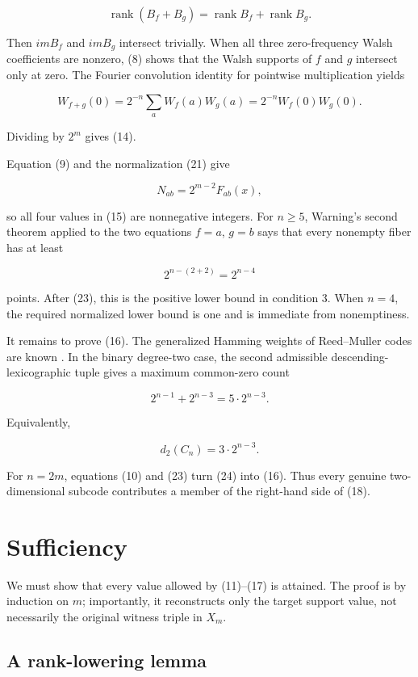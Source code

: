 \documentclass[11pt]{article}
\theoremstyle{remark}
\begin{document}
\[
\operatorname{rank}(B_f+B_g)
=\operatorname{rank}B_f+\operatorname{rank}B_g.
\]

Then $im B_f$ and $im B_g$ intersect trivially. When all three zero-frequency Walsh coefficients are nonzero, (8) shows that the Walsh supports of $f$ and $g$ intersect only at zero. The Fourier convolution identity for pointwise multiplication yields

\[
W_{f+g}(0)
=2^{-n}\sum_aW_f(a)W_g(a)
=2^{-n}W_f(0)W_g(0).
\tag{22}
\]

Dividing by $2^m$ gives (14).

Equation (9) and the normalization (21) give

\[
N_{ab}=2^{m-2}F_{ab}(x),
\tag{23}
\]

so all four values in (15) are nonnegative integers. For $n\ge 5$, Warning's second theorem \cite{ref1} applied to the two equations $f=a$, $g=b$ says that every nonempty fiber has at least

\[
2^{n-(2+2)}=2^{n-4}
\]

points. After (23), this is the positive lower bound in condition 3. When $n=4$, the required normalized lower bound is one and is immediate from nonemptiness.

It remains to prove (16). The generalized Hamming weights of Reed--Muller codes are known \cite{ref2}. In the binary degree-two case, the second admissible descending-lexicographic tuple gives a maximum common-zero count

\[
2^{n-1}+2^{n-3}=5\cdot2^{n-3}.
\]

Equivalently,

\[
d_2(C_n)=3\cdot2^{n-3}.
\tag{24}
\]

For $n=2m$, equations (10) and (23) turn (24) into (16). Thus every genuine two-dimensional subcode contributes a member of the right-hand side of (18).

\section{Sufficiency}

We must show that every value allowed by (11)--(17) is attained. The proof is by induction on $m$; importantly, it reconstructs only the target support value, not necessarily the original witness triple in $X_m$.

\subsection{A rank-lowering lemma}
\end{document}
